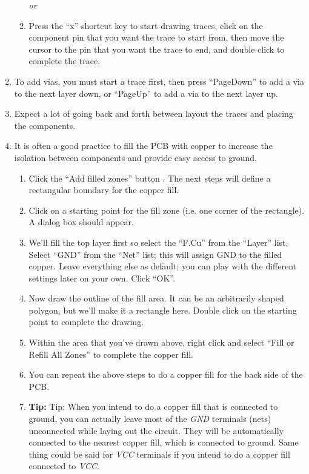 \documentclass[12pt,letterpaper]{scrartcl}
\begin{document}
\begin{enumerate}
\begin{enumerate}
			\textit{or}
			
			\item Press the ``x'' shortcut key to start drawing traces, click on the component pin that you want the trace to start from, then move the cursor to the pin that you want the trace to end, and double click to complete the trace.
			
		\end{enumerate}
	\item To add vias, you must start a trace first, then press ``PageDown'' to add a via to the next layer down, or ``PageUp'' to add a via to the next layer up. 
	
	\item Expect a lot of going back and forth between layout the traces and placing the components. 
	
	\item It is often a good practice to fill the PCB with copper to increase the isolation between components and provide easy access to ground. 
		\begin{enumerate}
			\item Click the ``Add filled zones'' button . The next steps will define a rectangular boundary for the copper fill. 
			
			\item Click on a starting point for the fill zone (i.e. one corner of the rectangle). A dialog box should appear. 
			
			\item We'll fill the top layer first so select the ``F.Cu'' from the ``Layer'' list. Select ``GND'' from the ``Net'' list; this will assign GND to the filled copper. Leave everything else as default; you can play with the different settings later on your own. Click ``OK''.
			
			\item Now draw the outline of the fill area. It can be an arbitrarily shaped polygon, but we'll make it a rectangle here. Double click on the starting point to complete the drawing. 
			
			\item Within the area that you've drawn above, right click and select ``Fill or Refill All Zones'' to complete the copper fill. 
			
			\item You can repeat the above steps to do a copper fill for the back side of the PCB. 
			
			\item \textbf{Tip:} Tip: When you intend to do a copper fill that is connected to ground, you can actually leave most of the \emph{GND} terminals (nets) unconnected while laying out the circuit. They will be automatically connected to the nearest copper fill, which is connected to ground. Same thing could be said for \emph{VCC} terminals if you intend to do a copper fill connected to \emph{VCC}. 
						

\end{enumerate}
\end{enumerate}
\end{document}
